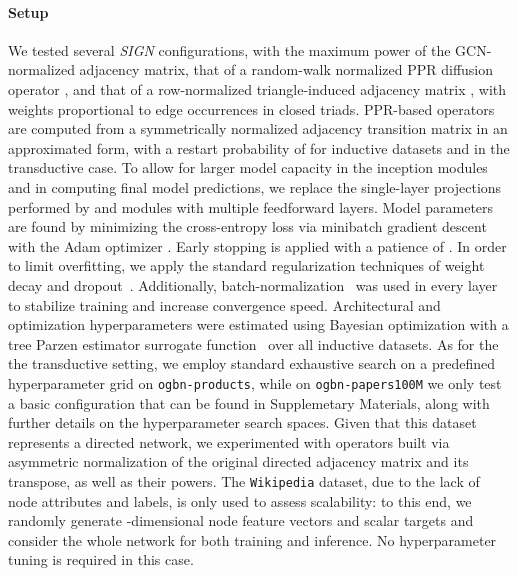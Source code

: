 \documentclass{article}
\begin{document}
\paragraph{Setup}
We tested several {\em SIGN} configurations, with  the maximum power of the GCN-normalized adjacency matrix,  that of a random-walk normalized PPR diffusion operator \cite{klicpera_diffusion_2019}, and  that of a row-normalized triangle-induced adjacency matrix \cite{monti2018motifnet}, with weights proportional to edge occurrences in closed triads. PPR-based operators are computed from a symmetrically normalized adjacency transition matrix in an approximated form, with a restart probability of  for inductive datasets and  in the transductive case.
To allow for larger model capacity in the inception modules and in computing final model predictions, we replace the single-layer projections performed by  and  modules with multiple feedforward layers. Model parameters are found by minimizing the cross-entropy loss via minibatch gradient descent with the Adam optimizer \cite{adam}. Early stopping is applied with a patience of . In order to limit overfitting, we apply the standard regularization techniques of weight decay and dropout~\cite{10.5555/2627435.2670313}. Additionally, batch-normalization~\cite{pmlr-v37-ioffe15} was used in every layer to stabilize training and increase convergence speed. 
Architectural and optimization hyperparameters were estimated using Bayesian optimization with a tree Parzen estimator surrogate function~\cite{NIPS2011_4443} over all inductive datasets. As for the the transductive setting, we employ standard exhaustive search on a predefined hyperparameter grid on \texttt{ogbn-products}, while on \texttt{ogbn-papers100M} we only test a basic configuration that can be found in Supplemetary Materials, along with further details on the hyperparameter search spaces. Given that this dataset represents a directed network, we experimented with operators built via asymmetric normalization of the original directed adjacency matrix and its transpose, as well as their powers.
The \texttt{Wikipedia} dataset, due to the lack of node attributes and labels, is only used to assess scalability: to this end, we randomly generate -dimensional node feature vectors and scalar targets and consider the whole network for both training and inference. No hyperparameter tuning is required in this case. 
\end{document}
